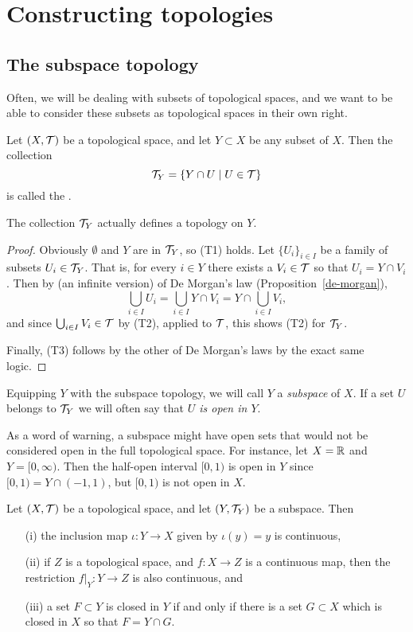 \section{Constructing topologies}
\subsection{The subspace topology}
Often, we will be dealing with subsets of topological spaces, and we want to be able to consider these subsets as topological spaces in their own right.
\begin{defn}
  Let $(X,\mathcal{T})$ be a topological space, and let $Y \subset X$ be any subset of $X$. Then the collection
  \[
    \mathcal{T}_Y = \{ Y \cap U \mid U \in \mathcal{T} \}
  \]
  is called the .
\end{defn}
\begin{lem}
  The collection $\mathcal{T}_Y$ actually defines a topology on $Y$.
\end{lem}
\begin{proof}
  Obviously $\emptyset$ and $Y$ are in $\mathcal{T}_Y$, so (T1) holds. Let $\{U_i\}_{i\in I}$ be a family of subsets $U_i \in \mathcal{T}_Y$. That is, for every $i \in Y$ there exists a $V_i \in \mathcal{T}$ so that $U_i = Y \cap V_i$. Then by (an infinite version) of De Morgan's law (Proposition~\ref{de-morgan}),
  \[
    \bigcup_{i \in I} U_i = \bigcup_{i \in I} Y \cap V_i = Y \cap \bigcup_{i \in I} V_i,
  \]
  and since $\bigcup_{i \in I} V_i \in \mathcal{T}$ by (T2), applied to $\mathcal{T}$, this shows (T2) for $\mathcal{T}_Y$.
  
  Finally, (T3) follows by the other of De Morgan's laws by the exact same logic.
\end{proof}
Equipping $Y$ with the subspace topology, we will call $Y$ a \emph{subspace} of $X$. If a set $U$ belongs to $\mathcal{T}_Y$ we will often say that \emph{$U$ is open in $Y$}.
\begin{example}
  \label{weird-opens-subspace-example}
  As a word of warning, a subspace might have open sets that would not be considered open in the full topological space. For instance, let $X = \mathbb{R}$ and $Y = [0,\infty)$. Then the half-open interval $[0,1)$ is open in $Y$ since $[0,1) = Y \cap (-1,1)$, but $[0,1)$ is not open in $X$.
\end{example}
\begin{prop}
  \label{props-subspace-top}
  Let $(X,\mathcal{T})$ be a topological space, and let $(Y,\mathcal{T}_Y)$ be a subspace. Then
  \begin{enumerate}
    \item[(i)] the inclusion map $\iota : Y \to X$ given by $\iota(y) = y$ is continuous,
    \item[(ii)] if $Z$ is a topological space, and $f : X \to Z$ is a continuous map, then the restriction $f|_Y : Y \to Z$ is also continuous, and
    \item[(iii)] a set $F \subset Y$ is closed in $Y$ if and only if there is a set $G \subset X$ which is closed in $X$ so that $F = Y \cap G$.
  \end{enumerate}
\end{prop}
